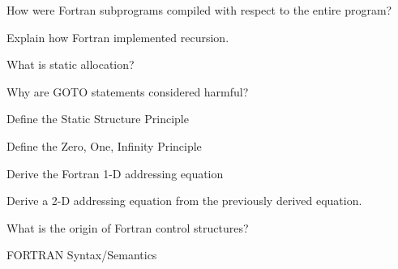 \documentclass{exam} %
\begin{document}
\begin{questions}
  \question How were Fortran subprograms compiled with respect to the entire program?

  \question Explain how Fortran implemented recursion.

  \question What is static allocation?

  \question Why are GOTO statements considered harmful?

  \question Define the Static Structure Principle

  \question Define the Zero, One, Infinity Principle

  \question Derive the Fortran 1-D addressing equation

  \question Derive a 2-D addressing equation from the previously derived equation.

  \question What is the origin of Fortran control structures?

  \pagebreak

  \question FORTRAN Syntax/Semantics
\end{questions}
\end{document}
